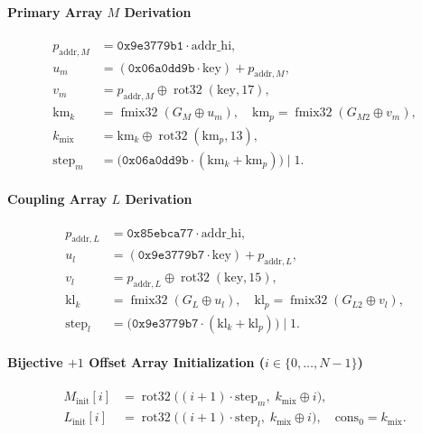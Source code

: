 \documentclass[conference]{IEEEtran}
\DeclareMathOperator{\rot}{rot32}
\DeclareMathOperator{\fmix}{fmix32}
\begin{document}
\paragraph{Primary Array $M$ Derivation}
\begin{equation}\label{eq:derive_m}
\begin{aligned}
p_{\text{addr}, M} &= \mathtt{0x9e3779b1} \cdot \text{addr\_hi}, \\
u_m &= (\mathtt{0x06a0dd9b} \cdot \text{key}) + p_{\text{addr}, M}, \\
v_m &= p_{\text{addr}, M} \oplus \rot(\text{key}, 17), \\
\text{km}_k &= \fmix(G_M \oplus u_m), \quad \text{km}_p = \fmix(G_{M2} \oplus v_m), \\
k_{\text{mix}} &= \text{km}_k \oplus \rot(\text{km}_p, 13), \\
\text{step}_m &= \big(\mathtt{0x06a0dd9b} \cdot (\text{km}_k + \text{km}_p)\big) \mid 1.
\end{aligned}
\end{equation}

\paragraph{Coupling Array $L$ Derivation}
\begin{equation}\label{eq:derive_l}
\begin{aligned}
p_{\text{addr}, L} &= \mathtt{0x85ebca77} \cdot \text{addr\_hi}, \\
u_l &= (\mathtt{0x9e3779b7} \cdot \text{key}) + p_{\text{addr}, L}, \\
v_l &= p_{\text{addr}, L} \oplus \rot(\text{key}, 15), \\
\text{kl}_k &= \fmix(G_L \oplus u_l), \quad \text{kl}_p = \fmix(G_{L2} \oplus v_l), \\
\text{step}_l &= \big(\mathtt{0x9e3779b7} \cdot (\text{kl}_k + \text{kl}_p)\big) \mid 1.
\end{aligned}
\end{equation}

\paragraph{Bijective $+1$ Offset Array Initialization ($i \in \{0, \dots, N-1\}$)}
\begin{equation}\label{eq:init_arrays}
\begin{aligned}
M_{\text{init}}[i] &= \rot\big((i + 1) \cdot \text{step}_m,\; k_{\text{mix}} \oplus i\big), \\
L_{\text{init}}[i] &= \rot\big((i + 1) \cdot \text{step}_l,\; k_{\text{mix}} \oplus i\big), \quad \text{cons}_0 = k_{\text{mix}}.
\end{aligned}
\end{equation}
\end{document}
